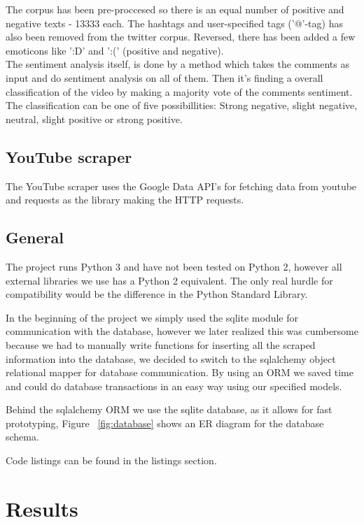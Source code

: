 \documentclass[conference]{IEEEtran}
\begin{document}
The corpus has been pre-proccesed so there is an equal number of positive and negative texts - 13333 each. The hashtags and user-specified tags ('@'-tag) has also been removed from the twitter corpus. Reversed, there has been added a few emoticons like ':D' and ':(' (positive and negative).\\

The sentiment analysis itself, is done by a method which takes the comments as input and do sentiment analysis on all of them. Then it's finding a overall classification of the video by making a majority vote of the comments sentiment. The classification can be one of five possibillities: Strong negative, slight negative, neutral, slight positive or strong positive.


\subsection{YouTube scraper}
The YouTube scraper uses the Google Data API's for fetching data from youtube and requests as the library making the HTTP requests.

\subsection{General}
The project runs Python 3 and have not been tested on Python 2,
however all external libraries we use has a Python 2 equivalent. 
The only real hurdle for compatibility would be the difference in the Python Standard Library.

In the beginning of the project we simply used the sqlite \cite{sqllite} module for communication with the database, however we later realized this was cumbersome because we had to manually write functions for inserting all the scraped information into the database, we decided to switch to the sqlalchemy object relational mapper \cite{sqlalchemy} for database communication. By using an ORM we saved time and could do database transactions in an easy way using our specified models.

Behind the sqlalchemy ORM we use the sqlite database, as it allows for fast prototyping, Figure ~\ref{fig:database} shows an ER diagram for the database schema.

Code listings can be found in the listings section.

\section{Results}
\end{document}
